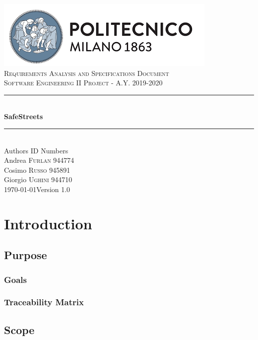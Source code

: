 \documentclass[12pt]{article}
\begin{document}
	\begin{titlepage}
		\newcommand{\HRule}{\rule{\linewidth}{0.7mm}}
		\center
		\includegraphics{PolimiLogo.png}\\[1cm]
		
		\textsc{\LARGE Requirements Analysis and Specifications Document}\\[1cm]
		\textsc{\large Software Engineering II Project - A.Y. 2019-2020}\\[1cm]
		\HRule \\[0.4cm]
		{ \huge \bfseries SafeStreets}\\[0.15cm]
		\HRule \\[1.5cm]
		{\large Authors  \hfill ID Numbers}\\[0.4cm]
		{\large Andrea \textsc{Furlan}  \hfill 944774}\\[0.2cm]
		{\large Cosimo \textsc{Russo}  \hfill 945891}\\[0.2cm]
		{\large Giorgio \textsc{Ughini} \hfill 944710}\\[2cm]
		{\large \today  \hfill Version 1.0}
		\vfill
	\end{titlepage}
	\clearpage
	{\hypersetup{hidelinks}\tableofcontents}
	\clearpage
	\section{Introduction}
	\subsection{Purpose}
	
	\newpage
	\subsubsection{Goals}
	
	\vfill
	\subsubsection{Traceability Matrix}
	
	\newpage
	\subsection{Scope}
	
\end{document}
